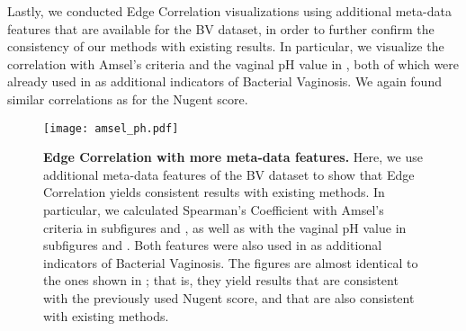 Lastly, we conducted Edge Correlation visualizations using additional meta-data features
that are available for the \ac{BV} dataset,
in order to further confirm the consistency of our methods with existing results.
In particular, we visualize the correlation with Amsel's criteria \cite{Amsel1983} and the vaginal pH value
in , both of which were already used in \cite{Srinivasan2012} as additional indicators of Bacterial Vaginosis.
We again found similar correlations as for the Nugent score.


\begin{figure}[!hpbt]
    \centering
    \texttt{[image: amsel\_ph.pdf]}
    \begin{subfigure}{0pt}
        \label{fig:amsel_ph:sub:amsel_em}
    \end{subfigure}
    \begin{subfigure}{0pt}
        \label{fig:amsel_ph:sub:amsel_ei}
    \end{subfigure}
    \begin{subfigure}{0pt}
        \label{fig:amsel_ph:sub:ph_em}
    \end{subfigure}
    \begin{subfigure}{0pt}
        \label{fig:amsel_ph:sub:ph_ei}
    \end{subfigure}
    \caption[Edge Correlation with more meta-data features]{
        \textbf{Edge Correlation with more meta-data features.}
        Here, we use additional meta-data features of the \ac{BV} dataset
        to show that Edge Correlation yields consistent results with existing methods.
        In particular, we calculated Spearman's Coefficient with Amsel's criteria \cite{Amsel1983}
        in subfigures  and ,
        as well as with the vaginal pH value
        in subfigures  and .
        Both features were also used in  as additional indicators of Bacterial Vaginosis.
        The figures are almost identical to the ones shown in ;
        that is, they yield results that are consistent with the previously used Nugent score,
        and that are also consistent with existing methods.
    }
    \label{fig:amsel_ph}
\end{figure}

